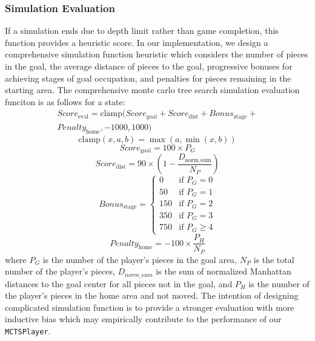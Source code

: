 \subsubsection{Simulation Evaluation}
If a simulation ends due to depth limit rather than game completion, this function provides a heuristic score. In our implementation, we design a comprehensive simulation function heuristic which considers the number of pieces in the goal, the average distance of pieces to the goal, progressive bonuses for achieving stages of goal occupation, and penalties for pieces remaining in the starting area. The comprehensive monte carlo tree search simulation evaluation funciton is as follows for a state:
\begin{equation}
\begin{split}
Score_{\text{eval}} = \text{clamp}(Score_{\text{goal}} + Score_{\text{dist}} +
Bonus_{\text{stage}} + \\ Penalty_{\text{home}}, -1000, 1000)
\end{split}
\end{equation}
\begin{equation}
\text{clamp}(x, a, b) = \max(a, \min(x, b))
\end{equation}
\begin{equation}
Score_{\text{goal}} = 100 \times P_G
\end{equation}
\begin{equation}
Score_{\text{dist}} = 90 \times \left(1 - \frac{D_{\text{norm\_sum}}}{N_P}\right)
\end{equation}
\begin{equation}
Bonus_{\text{stage}} =
\begin{cases}
0 & \text{if } P_G = 0 \\
50 & \text{if } P_G = 1 \\
150 & \text{if } P_G = 2 \\
350 & \text{if } P_G = 3 \\
750 & \text{if } P_G \geq 4 
\end{cases}
\end{equation}
\begin{equation}
Penalty_{\text{home}} = -100 \times \frac{P_H}{N_P}
\end{equation}
where $P_G$ is the number of the player's pieces in the goal area,
$N_P$ is the total number of the player's pieces,
$D_{norm\_sum}$ is the sum of normalized Manhattan distances to the goal center for all pieces not in the goal, and 
$P_H$ is the number of the player's pieces in the home area and not moved. The intention of designing complicated simulation function is to provide a stronger evaluation with more inductive bias which may empirically contribute to the performance of our \texttt{MCTSPlayer}.

